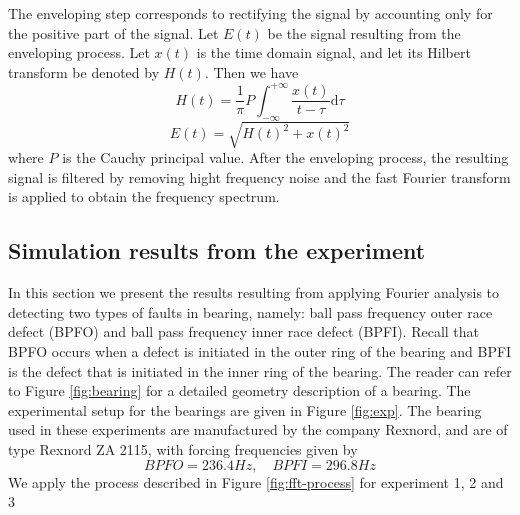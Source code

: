 \documentclass[../Main/thesis.tex]{subfiles}
\begin{document}
\justify
The enveloping step corresponds to rectifying the signal by accounting only for the positive part of the signal. Let $E(t)$ be the signal resulting from the enveloping process. Let $x(t)$ is the time domain signal, and let its Hilbert transform be denoted by $H(t)$. Then we have
\begin{equation}
H(t) = \frac{1}{\pi}P\int_{-\infty}^{+\infty}\frac{x(t)}{t-\tau}\mathrm{d}\tau
\end{equation}
\begin{equation}
E(t) = \sqrt{H(t)^{2}+ x(t)^{2}}
\end{equation}
where $P$ is the Cauchy principal value. After the enveloping process, the resulting signal is filtered by removing hight frequency noise and the fast Fourier transform is applied to obtain the frequency spectrum.
\clearpage
\subsection{Simulation results from the experiment}
In this section we present the results resulting from applying Fourier analysis to detecting two types of faults in bearing, namely: ball pass frequency outer race defect (BPFO) and ball pass frequency inner race defect (BPFI). Recall that BPFO occurs when a defect is initiated in the outer ring of the bearing and BPFI is the defect that is initiated in the inner ring of the bearing. The reader can refer to Figure \ref{fig:bearing} for a detailed geometry description of a bearing. The experimental setup for the bearings are given in Figure \ref{fig:exp}. The bearing used in these experiments are manufactured by the company Rexnord, and are of type Rexnord ZA 2115, with forcing frequencies  given by 
\begin{equation}
BPFO = 236.4 Hz, \quad BPFI = 296.8 Hz \nonumber
\end{equation}
We apply the process described in Figure \ref{fig:fft-process} for experiment 1, 2 and 3
\end{document}
